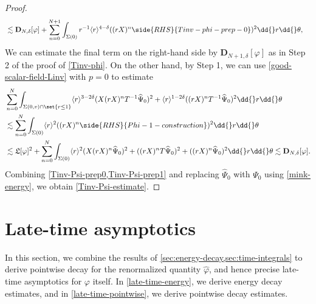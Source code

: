 \documentclass[10pt, reqno]{amsart}
\begin{document}
\begin{proof}
\begin{equation}
\begin{split}
&\lesssim \mathbf{D}_{N,\delta{}}[\varphi{}] + \sum_{n=0}^{N+1}\int _{\Sigma{}(0)} r^{-1}\langle{}r\rangle^{4-\delta{}}((rX)^n\side{RHS}{Tinv-phi-prep-0})^2\dd{}r\dd{}\theta{},
\end{split}
\end{equation}
We can estimate the final term on the right-hand side by \(\mathbf{D}_{N+1,\delta{}}[\varphi{}]\) as
in Step 2 of the proof of \cref{Tinv-phi}. On the other hand, by Step 1, we
can use \cref{good-scalar-field-Linv} with \(p = 0\) to estimate
\begin{equation}\label{Tinv-Psi-prep1}
\begin{split}
&\sum_{n=0}^N\int _{\Sigma{}(0,v)\cap \set{r\le 1}} \langle{}r\rangle^{3-2\delta{}}(X(rX)^nT^{-1}\widehat{\Psi{}}_0)^2 + \langle{}r\rangle^{1-2\delta{}}((rX)^nT^{-1}\widehat{\Psi{}}_0)^2 \dd{}r\dd{}\theta{} \\
&\lesssim \sum_{n=0}^N\int _{\Sigma{}(0)} \langle{}r\rangle^2((rX)^n\side{RHS}{Phi-1-construction})^2\dd{}r\dd{}\theta{} \\
&\lesssim \mathfrak{L}[\varphi{}]^2 + \sum_{n=0}^N\int _{\Sigma{}(0)} \langle{}r\rangle^2(X(rX)^n\widehat{\Psi{}}_0)^2 + ((rX)^nT\widehat{\Psi{}}_0)^2 + ((rX)^n\widehat{\Psi{}}_0)^2\dd{}r\dd{}\theta{} \lesssim \mathbf{D}_{N,\delta{}}[\varphi{}].
\end{split}
\end{equation}
Combining \cref{Tinv-Psi-prep0,Tinv-Psi-prep1} and replacing \(\widehat{\Psi{}}_0\) with
\(\Psi_0\) using \cref{mink-energy}, we obtain \cref{Tinv-Psi-estimate}.
\end{proof}
\section{Late-time asymptotics}
\label{sec:late-time-asymptotics} In this section, we combine the results of
\cref{sec:energy-decay,sec:time-integrals} to derive pointwise decay for the
renormalized quantity \(\widehat{\varphi{}}\), and hence precise late-time
asymptotics for \(\varphi{}\) itself. In \cref{late-time-energy}, we derive energy
decay estimates, and in \cref{late-time-pointwise}, we derive pointwise decay
estimates.
\end{document}
